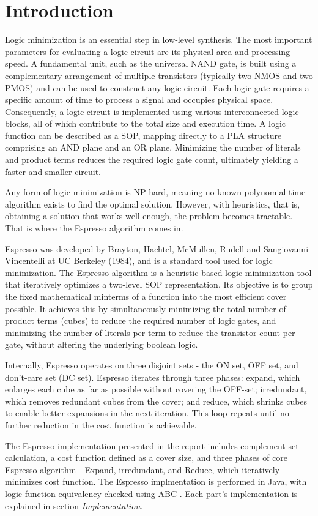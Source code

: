 \chapter{Introduction}

Logic minimization is an essential step in low-level synthesis. The most important parameters for evaluating a logic circuit are its physical area and processing speed. A fundamental unit, such as the universal \ac{NAND} gate, is built using a complementary arrangement of multiple transistors (typically two \ac{NMOS} and two \ac{PMOS}) and can be used to construct any logic circuit. Each logic gate requires a specific amount of time to process a signal and occupies physical space. Consequently, a logic circuit is implemented using various interconnected logic blocks, all of which contribute to the total size and execution time. A logic function can be described as a \ac{SOP}, mapping directly to a \ac{PLA} structure comprising an AND plane and an OR plane. Minimizing the number of literals and product terms reduces the required logic gate count, ultimately yielding a faster and smaller circuit.

Any form of logic minimization is \ac{NP}-hard, meaning no known polynomial-time algorithm exists to find the optimal solution. However, with heuristics, that is, obtaining a solution that works well enough, the problem becomes tractable. That is where the Espresso algorithm comes in.

Espresso was developed by Brayton, Hachtel, McMullen, Rudell and Sangiovanni-Vincentelli at UC Berkeley (1984)\cite{demicheli1994}, and is a standard tool used for logic minimization.
The Espresso algorithm is a heuristic-based logic minimization tool that iteratively optimizes a two-level \ac{SOP} representation. Its objective is to group the fixed mathematical minterms of a function into the most efficient cover possible. It achieves this by simultaneously minimizing the total number of product terms (cubes) to reduce the required number of logic gates, and minimizing the number of literals per term to reduce the transistor count per gate, without altering the underlying boolean logic. 

Internally, Espresso operates on three disjoint sets - the ON set, OFF set, and don't-care set (DC set). Espresso iterates through three phases: expand, which enlarges each cube as far as possible without covering the OFF-set; irredundant, which removes redundant cubes from the cover; and reduce, which shrinks cubes to enable better expansions in the next iteration. This loop repeats until no further reduction in the cost function is achievable.

The Espresso implementation presented in the report includes complement set calculation, a cost function defined as a cover size, and three phases of core Espresso algorithm - Expand, irredundant, and Reduce, which iteratively minimizes cost function. The Espresso implmentation is performed in Java, with logic function equivalency checked using ABC \cite{abc}. Each part's implementation is explained in section \textit{Implementation}.